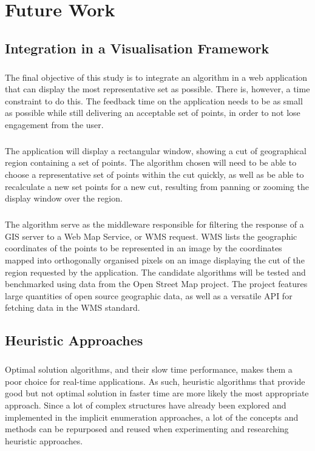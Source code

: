 \chapter{Future Work}
\label{chap:future}
\section{Integration in a Visualisation Framework}
\paragraph{}
The final objective of this study is to integrate an algorithm in a web application that can display the most representative set as possible. There is, however, a time constraint to do this. The feedback time on the application needs to be as small as possible while still delivering an acceptable set of points, in order to not lose engagement from the user.
\paragraph{}
The application will display a rectangular window, showing a cut of geographical region containing a set of points. The algorithm chosen will need to be able to choose a representative set of points within the cut quickly, as well as be able to recalculate a new set points for a new cut, resulting from panning or zooming the display window over the region.
\paragraph{}
The algorithm serve as the middleware responsible for filtering the response of a GIS server to a Web Map Service, or WMS request. WMS lists the geographic coordinates of the points to be represented in an image by the coordinates mapped into orthogonally organised pixels on an image displaying the cut of the region requested by the application.
The candidate algorithms will be tested and benchmarked using data from the Open Street Map project. The project features large quantities of open source geographic data, as well as a versatile API for fetching data in the WMS standard.

\section{Heuristic Approaches}
\paragraph{}
Optimal solution algorithms, and their slow time performance, makes them a poor choice for real-time applications. As such, heuristic algorithms that provide good but not optimal solution in faster time are more likely the most appropriate approach.
Since a lot of complex structures have already been explored and implemented in the implicit enumeration approaches, a lot of the concepts and methods can be repurposed and reused when experimenting and researching heuristic approaches. 

